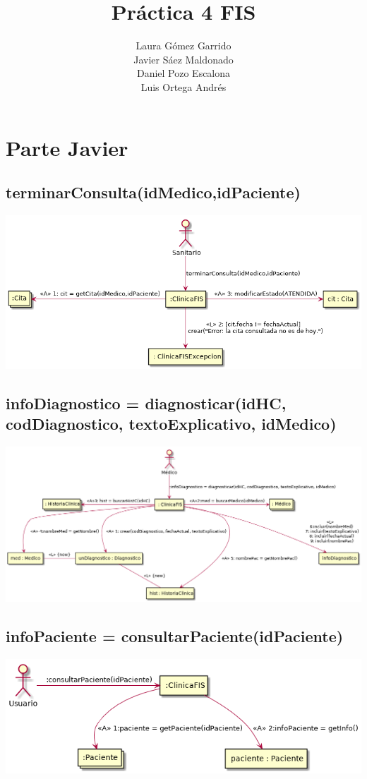 \documentclass[10pt,a4paper,spanish]{report}
\title{\textbf{Práctica 4 FIS}}
\author{Laura Gómez Garrido\\
		Javier Sáez Maldonado\\
		Daniel Pozo Escalona\\
		Luis Ortega Andrés}
\begin{document}
\maketitle

\section*{Parte Javier}
\subsection*{terminarConsulta(idMedico,idPaciente)}
\begin{center}
	\includegraphics[scale=0.6]{terminarConsulta.png}
\end{center}

\subsection*{infoDiagnostico = diagnosticar(idHC, codDiagnostico, textoExplicativo, 
idMedico)}
\begin{center}
	\includegraphics[scale=0.4]{diagnosticar.png}
\end{center}

\subsection*{infoPaciente = consultarPaciente(idPaciente)}
\begin{center}
	\includegraphics[scale=0.6]{infoPaciente.png}
\end{center}
\end{document}
